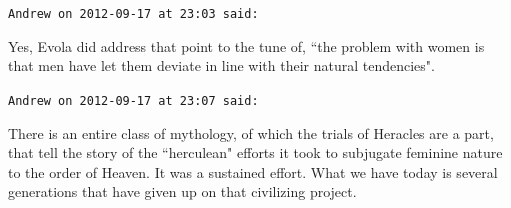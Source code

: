 \begin{footnotesize}
\begin{sffamily}
\hfill

\texttt{Andrew on 2012-09-17 at 23:03 said: }

Yes, Evola did address that point to the tune of, ``the problem with women is that men have let them deviate in line with their natural tendencies".


\hfill

\texttt{Andrew on 2012-09-17 at 23:07 said: }

There is an entire class of mythology, of which the trials of Heracles are a part, that tell the story of the ``herculean" efforts it took to subjugate feminine nature to the order of Heaven. It was a sustained effort. What we have today is several generations that have given up on that civilizing project.


\end{sffamily}\end{footnotesize}
